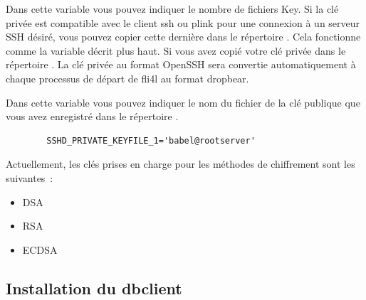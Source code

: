 \begin{description}
  Dans cette variable vous pouvez indiquer le nombre de fichiers Key. Si la clé
  privée est compatible avec le client ssh ou plink pour une connexion à un serveur
  SSH désiré, vous pouvez copier cette dernière dans le répertoire .
  Cela fonctionne comme la variable  décrit plus haut. 
  Si vous avez copié votre clé privée dans le répertoire .
  La clé privée au format OpenSSH sera convertie automatiquement à chaque processus
  de départ de fli4l au format dropbear.


  Dans cette variable vous pouvez indiquer le nom du fichier de la clé publique
  que vous avez enregistré dans le répertoire .

\begin{example}
\begin{verbatim}
        SSHD_PRIVATE_KEYFILE_1='babel@rootserver'
\end{verbatim}
\end{example}

  Actuellement, les clés prises en charge pour les méthodes de chiffrement sont
  les suivantes~:
  \begin{itemize}
  \item DSA
  \item RSA
  \item ECDSA
  \end{itemize}

\end{description}

\subsection {Installation du dbclient}

